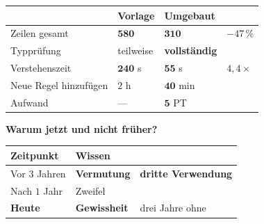 \begin{merksatz}
\begin{center}
{\small
\renewcommand{\arraystretch}{1.45}
\begin{tabular}{@{}P{2.8cm}P{2.0cm}P{2.2cm}P{2.0cm}@{}}
\toprule
& \textbf{Vorlage} & \textbf{Umgebaut} & \\
\midrule
Zeilen gesamt & $\mathbf{580}$ & $\mathbf{310}$ & $-47\,\%$\\
Typprüfung & \textcolor{akzent}{teilweise} & \textcolor{gruen}{\textbf{vollständig}} & \\
Verstehenszeit & $\mathbf{240}$ s & $\mathbf{55}$ s & $4{,}4\times$\\
Neue Regel hinzufügen & $2$ h & $\mathbf{40}$ min & \\
Aufwand & --- & $\mathbf{5}$ PT & \\
\bottomrule
\end{tabular}}
\end{center}

\begin{center}
\begin{minipage}{0.88\textwidth}
\end{minipage}
\end{center}

\textbf{Warum jetzt und nicht früher?}

\begin{center}
\renewcommand{\arraystretch}{1.45}
\begin{tabular}{@{}P{3.0cm}P{2.2cm}P{2.6cm}@{}}
\toprule
\textbf{Zeitpunkt} & \textbf{Wissen} & \\
\midrule
Vor $3$ Jahren & \textcolor{akzent}{\textbf{Vermutung}} & \textbf{dritte Verwendung}\\
Nach $1$ Jahr & \textcolor{mittel}{Zweifel} & \\
\textbf{Heute} & \textcolor{gruen}{\textbf{Gewissheit}} & \textcolor{gruen}{drei Jahre ohne}\\
\bottomrule
\end{tabular}
\end{center}

\begin{center}
\end{center}
\end{merksatz}

